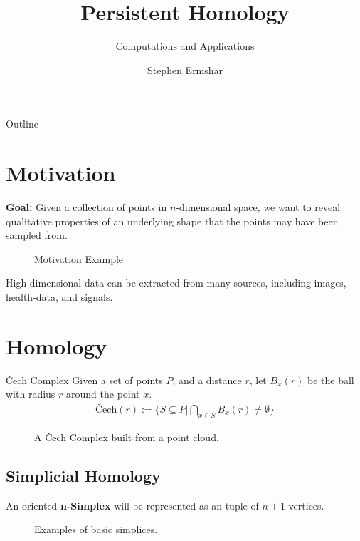 

\title{Persistent Homology}
\subtitle{Computations and Applications}
\author{Stephen Ermshar}
\date{}






\begin{frame}
    \titlepage
\end{frame}

\begin{frame}{Outline}
	\tableofcontents
\end{frame}

\section[Motivation]{Motivation}
\begin{frame}
	\textbf{Goal:} Given a collection of points in \(n\)-dimensional space, we want to reveal qualitative properties of an underlying shape that the points may have been sampled from.

	\begin{figure}
		
		\caption{Motivation Example}
	\end{figure}

	High-dimensional data can be extracted from many sources, including images, health-data, and signals.
\end{frame}

\section[Homology]{Homology}
\begin{frame}
	\begin{block}{\v{C}ech Complex}
		Given a set of points \(P\), and a distance \(r\), let \(B_x(r)\) be the ball with radius \(r\) around the point \(x\).
		\begin{align*}
			\textrm{\v{C}ech}(r) := \{ S \subseteq P | \bigcap_{x\in S} B_x(r) \neq \emptyset \}
		\end{align*}
		\cite{wagner}
	\end{block}
	\begin{figure}
		
		\caption{A \v{C}ech Complex built from a point cloud.}
	\end{figure}
\end{frame}

\subsection{Simplicial Homology}
\begin{frame}
	\begin{definition}
		An oriented \textbf{n-Simplex} will be represented as an tuple of \(n+1\) vertices.
	\end{definition}
	\begin{figure}
		
		\caption{Examples of basic simplices.}
	\end{figure}
\end{frame}

